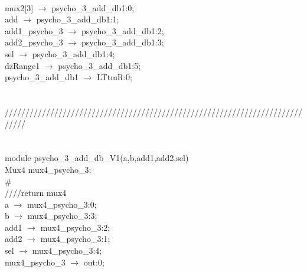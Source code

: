 {   \\
   \hspace*{2em}mux2[3] $\rightarrow$ psycho\_3\_add\_db1:0; \\
   \hspace*{2em}add $\rightarrow$ psycho\_3\_add\_db1:1; \\
   \hspace*{2em}add1\_psycho\_3 $\rightarrow$ psycho\_3\_add\_db1:2; \\
   \hspace*{2em}add2\_psycho\_3 $\rightarrow$ psycho\_3\_add\_db1:3; \\
   \hspace*{2em}sel $\rightarrow$ psycho\_3\_add\_db1:4; \\
   \hspace*{2em}dzRange1 $\rightarrow$ psycho\_3\_add\_db1:5; \\
   \hspace*{2em}psycho\_3\_add\_db1 $\rightarrow$ LTtmR:0; \\
} \\
\\
///////////////////////////////////////////////////////////////////////////// \\
\\
\\
module psycho\_3\_add\_db\_V1(a,b,add1,add2,sel){ \\
\hspace*{2em}Mux4 mux4\_psycho\_3; \\
\# \\
\hspace*{2em}////return mux4 \\
\hspace*{2em}a $\rightarrow$ mux4\_psycho\_3:0; \\
\hspace*{2em}b $\rightarrow$ mux4\_psycho\_3:3; \\
\hspace*{2em}add1 $\rightarrow$ mux4\_psycho\_3:2; \\
\hspace*{2em}add2 $\rightarrow$ mux4\_psycho\_3:1; \\
\hspace*{2em}sel $\rightarrow$ mux4\_psycho\_3:4; \\
\hspace*{2em}mux4\_psycho\_3 $\rightarrow$ out:0; \\
} \\
\\
